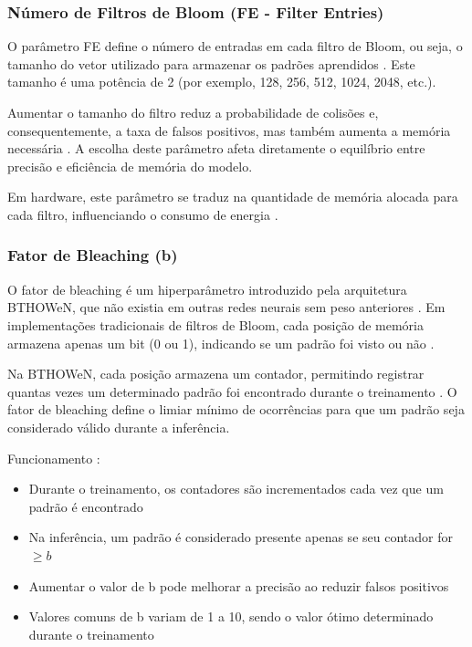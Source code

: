\documentclass{article}
\begin{document}
\subsubsection{Número de Filtros de Bloom (FE - Filter Entries)}

O parâmetro FE define o número de entradas em cada filtro de Bloom, ou seja, o tamanho do vetor utilizado para armazenar os padrões aprendidos \cite{santiago2020}. Este tamanho é uma potência de 2 (por exemplo, 128, 256, 512, 1024, 2048, etc.).

Aumentar o tamanho do filtro reduz a probabilidade de colisões e, consequentemente, a taxa de falsos positivos, mas também aumenta a memória necessária \cite{santiago2020, susskind2022}. A escolha deste parâmetro afeta diretamente o equilíbrio entre precisão e eficiência de memória do modelo.

Em hardware, este parâmetro se traduz na quantidade de memória alocada para cada filtro, influenciando o consumo de energia \cite{susskind2022}.

\subsubsection{Fator de Bleaching (b)}

O fator de bleaching é um hiperparâmetro introduzido pela arquitetura BTHOWeN, que não existia em outras redes neurais sem peso anteriores \cite{santiago2020}. Em implementações tradicionais de filtros de Bloom, cada posição de memória armazena apenas um bit (0 ou 1), indicando se um padrão foi visto ou não \cite{santiago2020, lusquino2020}. 

Na BTHOWeN, cada posição armazena um contador, permitindo registrar quantas vezes um determinado padrão foi encontrado durante o treinamento \cite{santiago2020}. O fator de bleaching define o limiar mínimo de ocorrências para que um padrão seja considerado válido durante a inferência.

Funcionamento \cite{santiago2020, susskind2022}:
\begin{itemize}
    \item Durante o treinamento, os contadores são incrementados cada vez que um padrão é encontrado
    \item Na inferência, um padrão é considerado presente apenas se seu contador for $\geq b$
    \item Aumentar o valor de b pode melhorar a precisão ao reduzir falsos positivos
    \item Valores comuns de b variam de 1 a 10, sendo o valor ótimo determinado durante o treinamento
\end{itemize}
\end{document}
